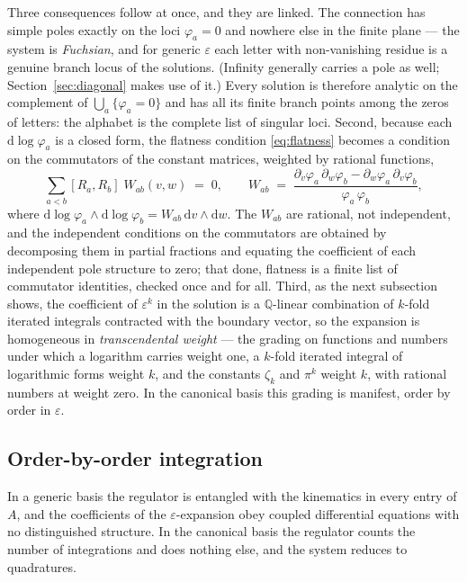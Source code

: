 \documentclass[11pt]{article}
\newcommand{\eps}{\varepsilon}
\newcommand{\dd}{\mathrm{d}}
\newcommand{\Q}{\mathbb{Q}}
\begin{document}
Three consequences follow at once, and they are linked.  The
connection has simple poles exactly on the loci $\varphi_a = 0$ and
nowhere else in the finite plane --- the system is \emph{Fuchsian},
and for generic $\eps$ each letter with non-vanishing residue is a
genuine branch locus of the solutions.  (Infinity generally carries a
pole as well; Section~\ref{sec:diagonal} makes use of it.)  Every
solution is therefore analytic on the complement of
$\bigcup_a \{\varphi_a = 0\}$ and has all its finite branch points
among the zeros of letters: the alphabet is the complete list of
singular loci.  Second, because each $\dd\log\varphi_a$ is a closed
form, the flatness condition \eqref{eq:flatness} becomes a condition
on the commutators of the constant matrices, weighted by rational
functions,
\begin{equation}
  \sum_{a<b} [R_a, R_b]\; W_{ab}(v,w) \;=\; 0 ,
  \qquad
  W_{ab} \;=\;
  \frac{\partial_v\varphi_a\,\partial_w\varphi_b
      - \partial_w\varphi_a\,\partial_v\varphi_b}
       {\varphi_a\,\varphi_b} ,
  \label{eq:flatletters}
\end{equation}
where $\dd\log\varphi_a \wedge \dd\log\varphi_b =
W_{ab}\,\dd v \wedge \dd w$.  The $W_{ab}$ are rational, not
independent, and the independent conditions on the commutators are
obtained by decomposing them in partial fractions and equating the
coefficient of each independent pole structure to zero; that done,
flatness is a finite list of commutator identities, checked once and
for all.  Third, as the next subsection shows, the coefficient of
$\eps^k$ in the solution is a $\Q$-linear combination of $k$-fold
iterated integrals contracted with the boundary vector, so the
expansion is homogeneous in \emph{transcendental weight} --- the
grading on functions and numbers under which a logarithm carries
weight one, a $k$-fold iterated integral of logarithmic forms weight
$k$, and the constants $\zeta_k$ and $\pi^k$ weight $k$, with
rational numbers at weight zero.  In the canonical basis this grading
is manifest, order by order in $\eps$.

\subsection{Order-by-order integration}

In a generic basis the regulator is entangled with the kinematics in
every entry of $A$, and the coefficients of the $\eps$-expansion obey
coupled differential equations with no distinguished structure.  In
the canonical basis the regulator counts the number of integrations
and does nothing else, and the system reduces to quadratures.
\end{document}
